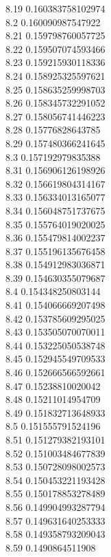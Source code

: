 {8.19	0.160383758102974\\
8.2	0.160090987547922\\
8.21	0.159798760057725\\
8.22	0.159507074593466\\
8.23	0.159215930118336\\
8.24	0.158925325597621\\
8.25	0.158635259998703\\
8.26	0.158345732291052\\
8.27	0.158056741446223\\
8.28	0.15776828643785\\
8.29	0.157480366241645\\
8.3	0.157192979835388\\
8.31	0.156906126198926\\
8.32	0.156619804314167\\
8.33	0.156334013165077\\
8.34	0.156048751737675\\
8.35	0.155764019020025\\
8.36	0.155479814002237\\
8.37	0.155196135676458\\
8.38	0.154912983036871\\
8.39	0.154630355079687\\
8.4	0.154348250803144\\
8.41	0.154066669207498\\
8.42	0.153785609295025\\
8.43	0.153505070070011\\
8.44	0.153225050538748\\
8.45	0.152945549709533\\
8.46	0.152666566592661\\
8.47	0.15238810020042\\
8.48	0.15211014954709\\
8.49	0.151832713648933\\
8.5	0.151555791524196\\
8.51	0.151279382193101\\
8.52	0.151003484677839\\
8.53	0.150728098002573\\
8.54	0.150453221193428\\
8.55	0.150178853278489\\
8.56	0.149904993287794\\
8.57	0.149631640253333\\
8.58	0.149358793209043\\
8.59	0.1490864511908\\
}
